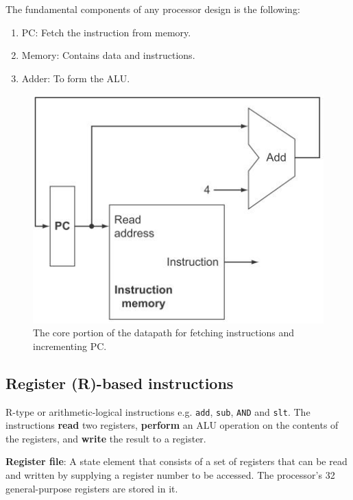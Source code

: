 \documentclass[10pt,a4paper]{article}
\begin{document}
The fundamental components of any processor design is the following:
\begin{enumerate}
    \item PC: Fetch the instruction from memory.
    \item Memory: Contains data and instructions.
    \item Adder: To form the ALU. 
\end{enumerate}
\begin{figure} [h!]
    \centering
    \includegraphics[scale=0.6]{Core data path.JPG}
    \caption{The core portion of the datapath for fetching instructions and incrementing PC.}
\end{figure}

\subsection{Register (R)-based instructions}

R-type or arithmetic-logical instructions e.g. \texttt{add}, \texttt{sub}, \texttt{AND} and
\texttt{slt}. The instructions \textbf{read} two registers, \textbf{perform} an ALU operation on the
contents of the registers, and \textbf{write} the result to a register.

\begin{tcolorbox}[breakable,colback=white]
    \textbf{Register file}: A state element that consists of a set of registers that can be read and
    written by supplying a register number to be accessed. The processor’s 32 general-purpose
    registers are stored in it. 
\end{tcolorbox}
\end{document}
